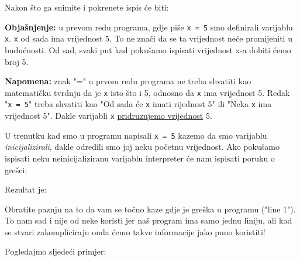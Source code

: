	Nakon što ga snimite i pokrenete ispis će biti:


	\textbf{Objašnjenje:} u prevom redu programa, gdje piše \verb|x = 5| smo
	definirali varijablu \verb|x|. \verb|x| od sada ima vrijednost 5. To ne znači
	da se ta vrijednost neće promijeniti u budućnosti. 
	Od sad, svaki put kad pokušamo ispisati vrijednost x-a dobiti ćemo broj 5.

	\textbf{Napomena:} znak "=" u prvom redu programa ne treba shvatiti kao
	matematičku tvrdnju da je \verb+x+ isto što i 5, odnosno da \verb+x+ ima
	vrijednost 5. Redak "\verb+x = 5+" treba shvatiti kao "Od sada će \verb+x+
	imati rijednost 5" ili "Neka \verb+x+ ima vrijednost 5". Dakle varijabli
	\verb+x+ \underline{pridruzujemo vrijednost} 5.

	U trenutku kad smo u programu napisali \verb|x = 5| kazemo da smo varijablu
	\emph{inicijalizirali}, dakle odredili smo joj neku početnu vrijednost. Ako
	pokušamo ispisati neku neinicijaliziranu varijablu interpreter će nam ispisati
	poruku o grešci:


	Rezultat je:


	Obratite paznju na to da vam se točno kaze gdje je greška u programu
	("line 1"). To nam sad i nije od neke koristi jer naš program ima samo jednu
	liniju, ali kad se stvari zakompliciraju onda ćemo takve informacije jako puno
	koristiti!
	
	Pogledajmo sljedeći primjer:


